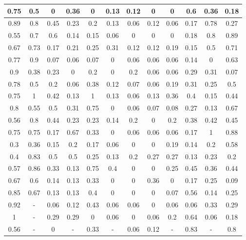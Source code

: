 \begin{table}[H]
\begin{tabular}{|c|c|c|c|c|c|c|c|c|c|c|c|}
0.75 & 0.5  & 0    & 0.36 & 0    & 0.13 & 0.12 & 0    & 0    & 0.6  & 0.36 & 0.18 \\ \hline
0.89 & 0.8  & 0.45 & 0.23 & 0.2  & 0.13 & 0.06 & 0.12 & 0.06 & 0.17 & 0.78 & 0.27 \\ \hline
0.55 & 0.7  & 0.6  & 0.14 & 0.15 & 0.06 & 0    & 0    & 0    & 0.18 & 0.8  & 0.89 \\ \hline
0.67 & 0.73 & 0.17 & 0.21 & 0.25 & 0.31 & 0.12 & 0.12 & 0.19 & 0.15 & 0.5  & 0.71 \\ \hline
0.77 & 0.9  & 0.07 & 0.06 & 0.07 & 0    & 0.06 & 0.06 & 0.06 & 0.14 & 0    & 0.63 \\ \hline
0.9  & 0.38 & 0.23 & 0    & 0.2  & 0    & 0.2  & 0.06 & 0.06 & 0.29 & 0.31 & 0.07 \\ \hline
0.78 & 0.5  & 0.2  & 0.06 & 0.38 & 0.12 & 0.07 & 0.06 & 0.19 & 0.31 & 0.25 & 0.5  \\ \hline
0.75 & 1    & 0.42 & 0.13 & 1    & 0.13 & 0.06 & 0.13 & 0.36 & 0.4  & 0.15 & 0.44 \\ \hline
0.8  & 0.55 & 0.5  & 0.31 & 0.75 & 0    & 0.06 & 0.07 & 0.08 & 0.27 & 0.13 & 0.67 \\ \hline
0.56 & 0.8  & 0.44 & 0.23 & 0.23 & 0.14 & 0.2  & 0    & 0.2  & 0.38 & 0.42 & 0.45 \\ \hline
0.75 & 0.75 & 0.17 & 0.67 & 0.33 & 0    & 0.06 & 0.06 & 0.06 & 0.17 & 1    & 0.88 \\ \hline
0.3  & 0.36 & 0.15 & 0.2  & 0.17 & 0.06 & 0    & 0    & 0.19 & 0.14 & 0.2  & 0.58 \\ \hline
0.4  & 0.83 & 0.5  & 0.5  & 0.25 & 0.13 & 0.2  & 0.27 & 0.27 & 0.13 & 0.23 & 0.2  \\ \hline
0.57 & 0.86 & 0.33 & 0.13 & 0.75 & 0.4  & 0    & 0    & 0.25 & 0.45 & 0.36 & 0.44 \\ \hline
0.67 & 0.6  & 0.14 & 0.13 & 0.33 & 0    & 0    & 0.36 & 0    & 0.17 & 0.25 & 0.09 \\ \hline
0.85 & 0.67 & 0.13 & 0.13 & 0.4  & 0    & 0    & 0    & 0.07 & 0.56 & 0.14 & 0.25 \\ \hline
0.92 & -    & 0.06 & 0.12 & 0.43 & 0.06 & 0.06 & 0    & 0.06 & 0.06 & 0.33 & 0.29 \\ \hline
1    & -    & 0.29 & 0.29 & 0    & 0.06 & 0    & 0.06 & 0.2  & 0.64 & 0.06 & 0.18 \\ \hline
0.56 & -    & 0    & -    & 0.33 & -    & 0.06 & 0.12 & -    & 0.83 & -    & 0.8  \\ \hline
\end{tabular}
\vspace*{15px}
\end{table}


